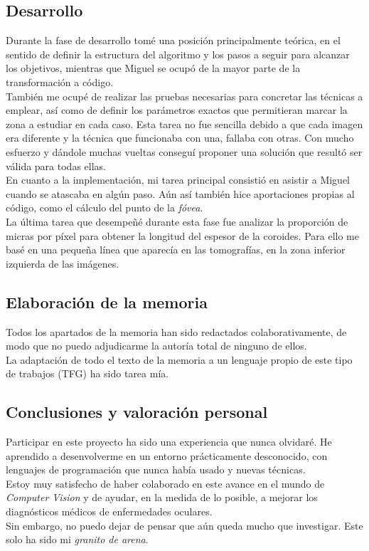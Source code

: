 \subsection{Desarrollo}
Durante la fase de desarrollo tomé una posición principalmente teórica,
en el sentido de definir la estructura del algoritmo y los pasos a seguir
para alcanzar los objetivos, mientras que Miguel se ocupó de la
mayor parte de la transformación a código. \\
También me ocupé de realizar las pruebas necesarias para concretar las 
técnicas a emplear, así como de definir los parámetros exactos que 
permitieran marcar la zona a estudiar en cada caso. Esta tarea no fue
sencilla debido a que cada imagen era diferente y la técnica que 
funcionaba con una, fallaba con otras. Con mucho esfuerzo y dándole
muchas vueltas conseguí proponer una solución que resultó ser válida 
para todas ellas.\\
En cuanto a la implementación, mi tarea principal consistió
en asistir a Miguel cuando se atascaba en algún paso. Aún así también
hice aportaciones propias al código, como el cálculo del punto de 
la \emph{fóvea}.\\
La última tarea que desempeñé durante esta fase fue analizar la 
proporción de micras por píxel para obtener la longitud del espesor
de la coroides. Para ello me basé en una pequeña línea que aparecía
en las tomografías, en la zona inferior izquierda de las imágenes.


\subsection{Elaboración de la memoria}
Todos los apartados de la memoria han sido redactados colaborativamente, 
de modo que no puedo adjudicarme la autoría total de ninguno de ellos.\\
La adaptación de todo el texto de la memoria a un lenguaje propio de 
este tipo de trabajos (TFG) ha sido tarea mía.

\subsection{Conclusiones y valoración personal}
Participar en este proyecto ha sido una experiencia que nunca olvidaré. 
He aprendido a desenvolverme en un entorno prácticamente desconocido,
con lenguajes de programación que nunca había usado y nuevas técnicas.\\
Estoy muy satisfecho de haber colaborado en este avance en el mundo
de \emph{Computer Vision} y de ayudar, en la medida de lo posible, a
mejorar los diagnósticos médicos de enfermedades oculares.\\
Sin embargo, no puedo dejar de pensar que aún queda mucho que investigar.
Este solo ha sido mi \emph{granito de arena}.
